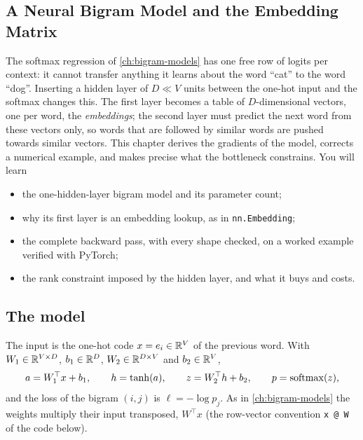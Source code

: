 \begin{notechapter}
\chapter{A Neural Bigram Model and the Embedding Matrix}\label{ch:bigram-neural}

\begin{chapterintro}
The softmax regression of \cref{ch:bigram-models} has one free row of logits per context: it
cannot transfer anything it learns about the word ``cat'' to the word ``dog''. Inserting a
hidden layer of $D\ll V$ units between the one-hot input and the softmax changes this. The first
layer becomes a table of $D$-dimensional vectors, one per word, the \emph{embeddings}; the second
layer must predict the next word from these vectors only, so words that are followed by
similar words are pushed towards similar vectors. This chapter derives the gradients of
the model, corrects a numerical example, and makes precise what the bottleneck
constrains. You will learn
\begin{itemize}[nosep]
  \item the one-hidden-layer bigram model and its parameter count;
  \item why its first layer is an embedding lookup, as in \texttt{nn.Embedding};
  \item the complete backward pass, with every shape checked, on a worked example verified
        with PyTorch;
  \item the rank constraint imposed by the hidden layer, and what it buys and costs.
\end{itemize}
\end{chapterintro}

\section{The model}\label{bigram-neural:sec:model}

The input is the one-hot code $x = e_i\in\mathbb{R}^V$ of the previous word. With $W_1\in\mathbb{R}^{V\times D}$, $b_1\in\mathbb{R}^D$, $W_2\in\mathbb{R}^{D\times V}$
and $b_2\in\mathbb{R}^V$,
\[
  a = W_1^\top x + b_1,\qquad h = \tanh(a),\qquad z = W_2^\top h + b_2,\qquad p = \operatorname{softmax}(z),
\]
and the loss of the bigram $(i, j)$ is $\ell = -\log p_j$. As in \cref{ch:bigram-models} the weights multiply their
input transposed, $W^\top x$ (the row-vector convention \texttt{x @ W} of
the code below).


\end{notechapter}
